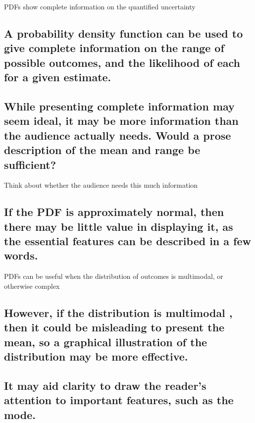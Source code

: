 \documentclass[]{book}
\begin{document}
 PDFs show complete information on the quantified uncertainty

\subsection{A probability density function can be used to give complete
information on the range of possible outcomes, and the likelihood of
each for a given
estimate.}\label{a-probability-density-function-can-be-used-to-give-complete-information-on-the-range-of-possible-outcomes-and-the-likelihood-of-each-for-a-given-estimate.}

\subsection{While presenting complete information may seem ideal, it may
be more information than the audience actually needs. Would a prose
description of the mean and range be
sufficient?}\label{while-presenting-complete-information-may-seem-ideal-it-may-be-more-information-than-the-audience-actually-needs.-would-a-prose-description-of-the-mean-and-range-be-sufficient}

 Think about whether the audience needs this much information

\subsection{If the PDF is approximately normal, then there may be little
value in displaying it, as the essential features can be described in a
few
words.}\label{if-the-pdf-is-approximately-normal-then-there-may-be-little-value-in-displaying-it-as-the-essential-features-can-be-described-in-a-few-words.}

 PDFs can be useful when the distribution of outcomes is multimodal, or
otherwise complex

\subsection{However, if the distribution is multimodal , then it could
be misleading to present the mean, so a graphical illustration of the
distribution may be more
effective.}\label{however-if-the-distribution-is-multimodal-then-it-could-be-misleading-to-present-the-mean-so-a-graphical-illustration-of-the-distribution-may-be-more-effective.}

\subsection{It may aid clarity to draw the reader's attention to
important features, such as the
mode.}\label{it-may-aid-clarity-to-draw-the-readers-attention-to-important-features-such-as-the-mode.}
\end{document}
